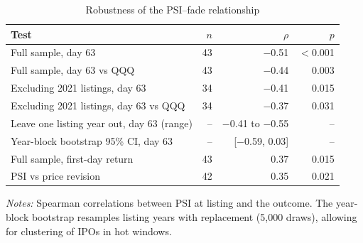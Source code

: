 \begin{table}[!htbp]\centering\footnotesize
\caption{Robustness of the PSI--fade relationship}\label{tab:robust}

\begin{threeparttable}
\begin{tabular}{lrrr}
\toprule
Test & $n$ & $\rho$ & $p$ \\
\midrule
Full sample, day 63 & 43 & $-$0.51 & $<$0.001 \\
Full sample, day 63 vs QQQ & 43 & $-$0.44 & 0.003 \\
Excluding 2021 listings, day 63 & 34 & $-$0.41 & 0.015 \\
Excluding 2021 listings, day 63 vs QQQ & 34 & $-$0.37 & 0.031 \\
Leave one listing year out, day 63 (range) & -- & $-$0.41 to $-$0.55 & -- \\
Year-block bootstrap 95\% CI, day 63 & -- & [$-$0.59, 0.03] & -- \\
Full sample, first-day return & 43 & 0.37 & 0.015 \\
PSI vs price revision & 42 & 0.35 & 0.021 \\
\bottomrule
\end{tabular}
\begin{tablenotes}[flushleft]\footnotesize
\item \textit{Notes:} Spearman correlations between PSI at listing and the outcome. The year-block bootstrap resamples listing years with replacement (5,000 draws), allowing for clustering of IPOs in hot windows.
\end{tablenotes}
\end{threeparttable}

\end{table}
